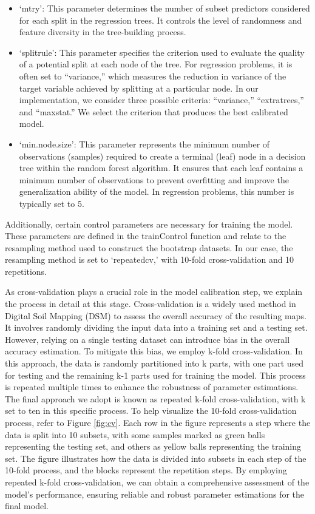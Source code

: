 \documentclass[
  10pt,
  b5paper,
  oneside]{book}
\begin{document}
\begin{itemize}
\item
  `mtry': This parameter determines the number of subset predictors considered for each split in the regression trees. It controls the level of randomness and feature diversity in the tree-building process.
\item
  `splitrule': This parameter specifies the criterion used to evaluate the quality of a potential split at each node of the tree. For regression problems, it is often set to ``variance,'' which measures the reduction in variance of the target variable achieved by splitting at a particular node. In our implementation, we consider three possible criteria: ``variance,'' ``extratrees,'' and ``maxstat.'' We select the criterion that produces the best calibrated model.
\item
  `min.node.size': This parameter represents the minimum number of observations (samples) required to create a terminal (leaf) node in a decision tree within the random forest algorithm. It ensures that each leaf contains a minimum number of observations to prevent overfitting and improve the generalization ability of the model. In regression problems, this number is typically set to 5.
\end{itemize}

Additionally, certain control parameters are necessary for training the model. These parameters are defined in the trainControl function and relate to the resampling method used to construct the bootstrap datasets. In our case, the resampling method is set to `repeatedcv,' with 10-fold cross-validation and 10 repetitions.

As cross-validation plays a crucial role in the model calibration step, we explain the process in detail at this stage. Cross-validation is a widely used method in Digital Soil Mapping (DSM) to assess the overall accuracy of the resulting maps. It involves randomly dividing the input data into a training set and a testing set. However, relying on a single testing dataset can introduce bias in the overall accuracy estimation. To mitigate this bias, we employ k-fold cross-validation. In this approach, the data is randomly partitioned into k parts, with one part used for testing and the remaining k-1 parts used for training the model. This process is repeated multiple times to enhance the robustness of parameter estimations. The final approach we adopt is known as repeated k-fold cross-validation, with k set to ten in this specific process. To help visualize the 10-fold cross-validation process, refer to Figure \ref{fig:cv}. Each row in the figure represents a step where the data is split into 10 subsets, with some samples marked as green balls representing the testing set, and others as yellow balls representing the training set. The figure illustrates how the data is divided into subsets in each step of the 10-fold process, and the blocks represent the repetition steps.
By employing repeated k-fold cross-validation, we can obtain a comprehensive assessment of the model's performance, ensuring reliable and robust parameter estimations for the final model.
\end{document}
